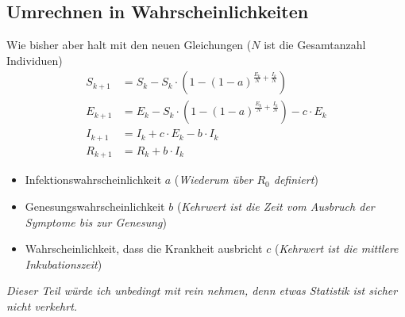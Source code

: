 \documentclass[11pt,a4paper]{article}
\begin{document}
\subsection{Umrechnen in Wahrscheinlichkeiten}
Wie bisher aber halt mit den neuen Gleichungen (\(N\) ist die Gesamtanzahl Individuen)
\begin{align*}
	S_{k+1} &= S_k - S_k \cdot \left( 1 - \left( 1 - a \right)^{\frac{E_k}{N} + \frac{I_k}{N}}\right) \\
	E_{k+1} &= E_k - S_k \cdot \left( 1 - \left( 1 - a \right)^{\frac{E_k}{N} + \frac{I_k}{N}}\right) - c \cdot E_k \\
	I_{k+1} &= I_k + c \cdot E_k - b \cdot I_k \\
	R_{k+1} &= R_k + b \cdot I_k
\end{align*}
\begin{itemize}
	\item Infektionswahrscheinlichkeit \(a\) (\textit{Wiederum über \(R_0\) definiert})
	\item Genesungswahrscheinlichkeit \(b\) (\textit{Kehrwert ist die Zeit vom Ausbruch der Symptome bis zur Genesung})
	\item Wahrscheinlichkeit, dass die Krankheit ausbricht \(c\) (\textit{Kehrwert ist die mittlere Inkubationszeit})
\end{itemize}
\textit{Dieser Teil würde ich unbedingt mit rein nehmen, denn etwas Statistik ist sicher nicht verkehrt.}
\end{document}
